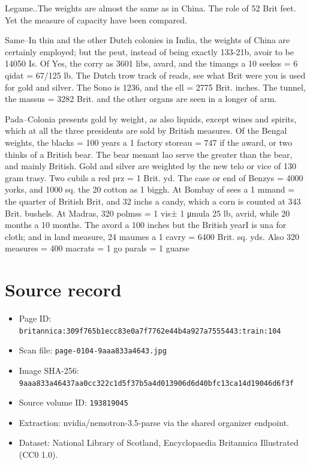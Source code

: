 \documentclass{article}
\begin{document}
Legame..The weights are almost the same as in China. The role of 52 Brit feet. Yet the measure of capacity have been compared.

Same–In thin and the other Dutch colonies in India, the weights of China are certainly employed; but the peut, instead of being exactly 133-21b, avoir to be 14050 Is. Of Yes, the corry as 3601 libs, avard, and the timangs a 10 seekss = 6 qidat = 67/125 lb. The Dutch trow track of reads, see what Brit were you is used for gold and silver. The Sono is 1236, and the ell = 2775 Brit. inches. The tunnel, the massus = 3282 Brit. and the other organs are seen in a longer of arm.

Pada–Colonia presents gold by weight, as also liquids, except wines and spirits, which at all the three presidents are sold by British measures. Of the Bengal weights, the blacks = 100 years a 1 factory storeau = 747 if the award, or two thinks of a British bear. The bear menant lao serve the greater than the bear, and mainly British. Gold and silver are weighted by the new telo or vice of 130 gram trasy. Two cubils a red prz = 1 Brit. yd. The case or end of Benzys = 4000 yorks, and 1000 sq. the 20 cotton as 1 biggh. At Bombay of sees a 1 mmand = the quarter of British Brit, and 32 inchs a candy, which a corn is counted at 343 Brit. bushels. At Madras, 320 polmss = 1 vis± 1 μmula 25 lb, avrid, while 20 months a 10 months. The avord a 100 inches but the British yearI is una for cloth; and in land measure, 24 maumes a 1 cavry = 6400 Brit. sq. yds. Also 320 measures = 400 macrats = 1 go parals = 1 guarse

\section*{Source record}
\begin{itemize}
\item Page ID: \texttt{britannica:309f765b1ecc83e0a7f7762e44b4a927a7555443:train:104}
\item Scan file: \texttt{page-0104-9aaa833a4643.jpg}
\item Image SHA-256: \texttt{9aaa833a46437aa0cc322c1d5f37b5a4d013906d6d40bfc13ca14d19046d6f3f}
\item Source volume ID: \texttt{193819045}
\item Extraction: nvidia/nemotron-3.5-parse via the shared organizer endpoint.
\item Dataset: National Library of Scotland, Encyclopaedia Britannica Illustrated (CC0 1.0).
\end{itemize}
\end{document}
